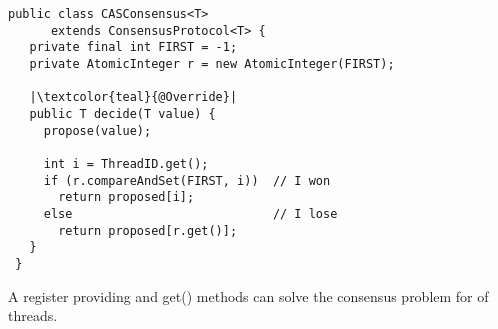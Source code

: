 \begin{frame}[fragile]{}
  \begin{lstlisting}[style = JavaStyle]
 public class CASConsensus<T> 
      extends ConsensusProtocol<T> {
   private final int FIRST = -1;
   private AtomicInteger r = new AtomicInteger(FIRST);

   |\textcolor{teal}{@Override}|
   public T decide(T value) {
     propose(value);

     int i = ThreadID.get();
     if (r.compareAndSet(FIRST, i))  // I won
       return proposed[i];
     else                            // I lose
       return proposed[r.get()];
   }
 }
  \end{lstlisting}
\end{frame}

\begin{frame}{}
  \begin{theorem}
    A register providing  and \textsf{get()} methods
    can solve the consensus problem for  of threads.
  \end{theorem}
\end{frame}
